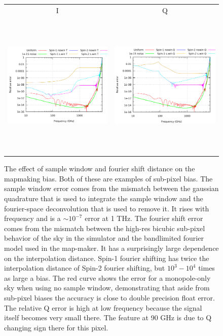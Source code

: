 \documentclass{article}
\begin{document}
\begin{figure}
	\centering
	\hspace*{-2mm}\begin{tabular}{cc}
		I & Q \\
		\includegraphics[height=70mm,clip,trim=0 0 0 0]{plots/spec_error_rel_v4_log_log_spin_win_T.pdf} &
		\includegraphics[height=70mm,clip,trim=30mm 0 0 0]{plots/spec_error_rel_v4_log_log_spin_win_Q.pdf}
	\end{tabular}
	\caption{The effect of sample window and fourier shift distance on the
	mapmaking bias. Both of these are examples of sub-pixel bias. The sample
	window error comes from the mismatch between the gaussian quadrature that is
	used to integrate the sample window and the fourier-space deconvolution that
	is used to remove it. It rises with frequency and is a $\sim 10^{-7}$ error
	at 1 THz. The fourier shift error comes from the mismatch between the
	high-res bicubic sub-pixel behavior of the sky in the simulator and the
	bandlimited fourier model used in the map-maker. It has a surprisingly large
	dependence on the interpolation distance. Spin-1 fourier shifting has
	twice the interpolation distance of Spin-2 fourier shifting, but $10^3-10^4$
	times as large a bias. The red curve shows the error for a
	monopole-only sky when using no sample window, demonstrating
	that aside from sub-pixel biases the accuracy is close to double
	precision float error.
	The relative Q error is high at low frequency because the signal itself
	becomes very small there. The feature at 90 GHz is due to Q changing
	sign there for this pixel.
	}
	\label{fig:subpixel-spec}
\end{figure}
\end{document}
